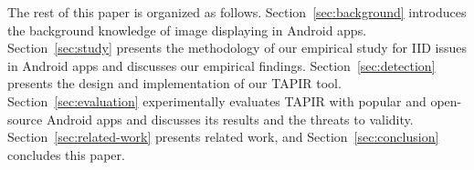 The rest of this paper is organized as follows. Section~\ref{sec:background} introduces the background knowledge of image displaying in Android apps. Section~\ref{sec:study} presents the methodology of our empirical study for IID issues in Android apps and discusses our empirical findings. Section~\ref{sec:detection} presents the design and implementation of our TAPIR tool. Section~\ref{sec:evaluation} experimentally evaluates TAPIR with popular and open-source Android apps and discusses its results and the threats to validity. Section~\ref{sec:related-work} presents related work, and Section~\ref{sec:conclusion} concludes this paper.
